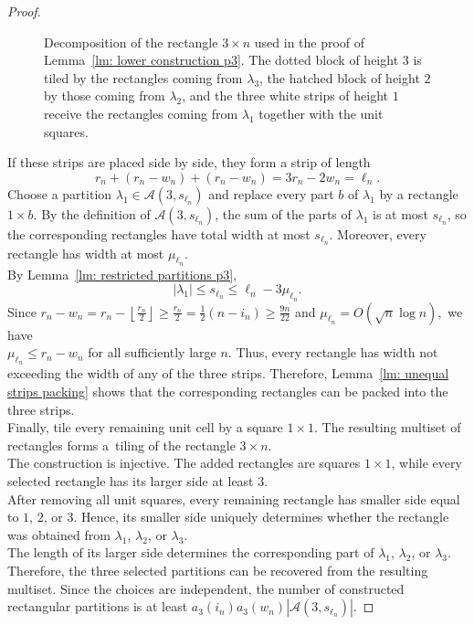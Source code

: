 \documentclass[12pt,a4paper]{amsart}
\numberwithin{equation}{section}
\theoremstyle{plain}
\theoremstyle{definition}
\theoremstyle{remark}
\begin{document}
\begin{proof}
\begin{figure}[ht]
{%
}
\caption{Decomposition of the rectangle $3\times n$ used in the proof of
Lemma~\ref{lm: lower construction p3}. The dotted block of height $3$ is tiled by
the rectangles coming from $\lambda_3$, the hatched block of height $2$ by those
coming from $\lambda_2$, and the three white strips of height $1$ receive the
rectangles coming from $\lambda_1$ together with the unit squares.}
\label{fig: strips p3}
\end{figure}
If these strips are placed side by side, they form a strip of length
$$
r_n+(r_n-w_n)+(r_n-w_n)=3r_n-2w_n=\ell_n.
$$
Choose a partition $\lambda_1\in\mathcal A(3,s_{\ell_n})$ and replace every part $b$ of $\lambda_1$ by a rectangle $1\times b$. By the definition of $\mathcal A(3,s_{\ell_n})$, the sum of the parts of $\lambda_1$ is at most $s_{\ell_n}$, so the corresponding rectangles have total width at most $s_{\ell_n}$. Moreover, every rectangle has width at most $\mu_{\ell_n}$.\\
By Lemma~\ref{lm: restricted partitions p3},
$$
|\lambda_1|\le s_{\ell_n} \le \ell_n-3\mu_{\ell_n}.
$$
Since
$
r_n-w_n=r_n-\left\lfloor\frac{r_n}{2}\right\rfloor
\ge \frac{r_n}{2}=\tfrac{1}{2}(n-i_n) \ge \frac{9n}{22}
$ 
and
$
\mu_{\ell_n}=O(\sqrt n\log n),
$ 
we have\\
$
\mu_{\ell_n}\le r_n-w_n
$
for all sufficiently large $n$. Thus, every rectangle has width not exceeding the width of any of the three strips. Therefore, Lemma~\ref{lm: unequal strips packing} shows that the corresponding rectangles can be packed into the three strips.\\
Finally, tile every remaining unit cell by a square $1\times1$. The resulting multiset of rectangles forms a~tiling of the rectangle $3\times n$.\\
The construction is injective. The added rectangles are squares $1\times1$, while every selected rectangle has its larger side at least $3$.\\
After removing all unit squares, every remaining rectangle has smaller side equal to $1$, $2$, or $3$. Hence, its smaller side uniquely determines whether the rectangle was obtained from $\lambda_1$, $\lambda_2$, or $\lambda_3$.\\
The length of its larger side determines the corresponding part of $\lambda_1$, $\lambda_2$, or $\lambda_3$. Therefore, the three selected partitions can be recovered from the resulting multiset. Since the choices are independent, the number of constructed rectangular partitions is at least $a_3(i_n)a_3(w_n)|\mathcal A(3,s_{\ell_n})|$.
\end{proof}
\end{document}
